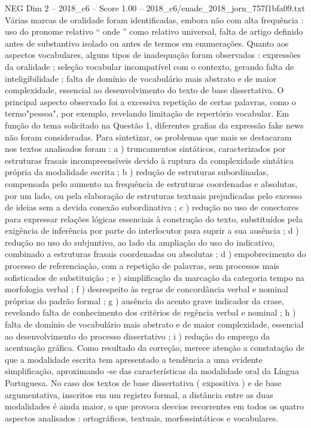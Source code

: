 \begin{textsample}{NEG Dim 2 – 2018\_c6 – Score 1.00 – 2018\_c6/enade\_2018\_jorn\_757f1bfa09.txt}
Várias marcas de oralidade foram identificadas, embora não com alta frequência : uso do pronome relativo “ onde ” como relativo universal, falta de artigo definido antes de substantivo isolado ou antes de termos em enumerações.
Quanto aos aspectos vocabulares, alguns tipos de inadequação foram observados : expressões da oralidade ; seleção vocabular incompatível com o contexto, gerando falta de inteligibilidade ; falta de domínio de vocabulário mais abstrato e de maior complexidade, essencial ao desenvolvimento do texto de base dissertativa.
O principal aspecto observado foi a excessiva repetição de certas palavras, como o termo"pessoa", por exemplo, revelando limitação de repertório vocabular.
Em função do tema solicitado na Questão 1, diferentes grafias da expressão fake news não foram consideradas.
Para sintetizar, os problemas que mais se destacaram nos textos analisados foram : a ) truncamentos sintáticos, caracterizados por estruturas frasais incompreensíveis devido à ruptura da complexidade sintática própria da modalidade escrita ; b ) redução de estruturas subordinadas, compensada pelo aumento na frequência de estruturas coordenadas e absolutas, por um lado, ou pela elaboração de estruturas textuais prejudicadas pelo excesso de ideias sem a devida conexão subordinativa ; c ) redução no uso de conectores para expressar relações lógicas essenciais à construção do texto, substituídos pela exigência de inferência por parte do interlocutor para suprir a sua ausência ; d ) redução no uso do subjuntivo, ao lado da ampliação do uso do indicativo, combinado a estruturas frasais coordenadas ou absolutas ; d ) empobrecimento do processo de referenciação, com a repetição de palavras, sem processos mais sofisticados de substituição ; e ) simplificação da marcação da categoria tempo na morfologia verbal ; f ) desrespeito às regras de concordância verbal e nominal próprias do padrão formal ; g ) ausência do acento grave indicador da crase, revelando falta de conhecimento dos critérios de regência verbal e nominal ; h ) falta de domínio de vocabulário mais abstrato e de maior complexidade, essencial ao desenvolvimento do processo dissertativo ; i ) redução do emprego da acentuação gráfica.
Como resultado da correção, merece atenção a constatação de que a modalidade escrita tem apresentado a tendência a uma evidente simplificação, aproximando -se das características da modalidade oral da Língua Portuguesa.
No caso dos textos de base dissertativa ( expositiva ) e de base argumentativa, inscritos em um registro formal, a distância entre as duas modalidades é ainda maior, o que provoca desvios recorrentes em todos os quatro aspectos analisados : ortográficos, textuais, morfossintáticos e vocabulares.

\end{textsample}
